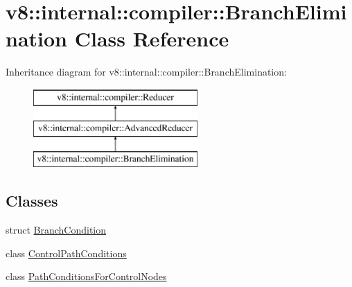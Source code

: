 \hypertarget{classv8_1_1internal_1_1compiler_1_1_branch_elimination}{}\section{v8\+:\+:internal\+:\+:compiler\+:\+:Branch\+Elimination Class Reference}
\label{classv8_1_1internal_1_1compiler_1_1_branch_elimination}
Inheritance diagram for v8\+:\+:internal\+:\+:compiler\+:\+:Branch\+Elimination\+:\begin{figure}[H]
\begin{center}
\leavevmode
\includegraphics[height=3.000000cm]{classv8_1_1internal_1_1compiler_1_1_branch_elimination}
\end{center}
\end{figure}
\subsection*{Classes}
\begin{DoxyCompactItemize}
\item 
struct \hyperlink{structv8_1_1internal_1_1compiler_1_1_branch_elimination_1_1_branch_condition}{Branch\+Condition}
\item 
class \hyperlink{classv8_1_1internal_1_1compiler_1_1_branch_elimination_1_1_control_path_conditions}{Control\+Path\+Conditions}
\item 
class \hyperlink{classv8_1_1internal_1_1compiler_1_1_branch_elimination_1_1_path_conditions_for_control_nodes}{Path\+Conditions\+For\+Control\+Nodes}
\end{DoxyCompactItemize}
